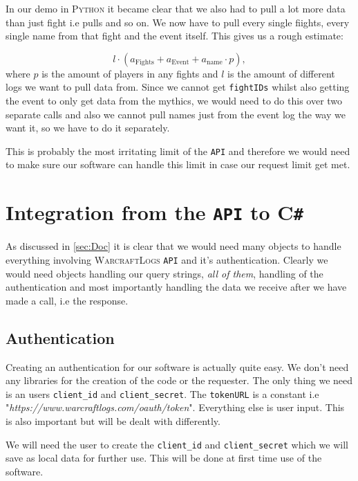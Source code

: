 \documentclass[10pt, a4paper]{memoir}
\numberwithin{equation}{section}
\theoremstyle{plain}
\theoremstyle{defp}
\theoremstyle{dotless}
\theoremstyle{definition}
\theoremstyle{dotless}
\theoremstyle{dotless}
\theoremstyle{defp}
\theoremstyle{defp}
\theoremstyle{be}          %
\theoremstyle{defp}
\newcommand\lf[1]{\left(#1\right)}
\newcommand\ttt[1]{\texttt{#1}}
\newcommand\tsc[1]{\textsc{#1}}
\begin{document}
\medskip

In our demo in \textsc{Python} it became clear that we also had to pull a lot more data than just fight i.e pulls and so on. We now have to pull every single fiights, every single name from that fight and the event itself. This gives us a rough estimate:

$$l\cdot\lf{a_{\text{Fights}}+a_{\text{Event}}+a_{\text{name}}\cdot p},$$
where $p$ is the amount of players in any fights and $l$ is the amount of different logs we want to pull data from. Since we cannot get \ttt{fightIDs} whilst also getting the event to only get data from the mythics, we would need to do this over two separate calls and also we cannot pull names just from the event log the way we want it, so we have to do it separately. 

\medskip

This is probably the most irritating limit of the \ttt{API} and therefore we would need to make sure our software can handle this limit in case our request limit get met.


\section{Integration from the \ttt{API} to C\ttt{\#}}

As discussed in \ref{sec:Doc} it is clear that we would need many objects to handle everything involving \tsc{WarcraftLogs} \ttt{API} and it's authentication. Clearly we would need objects handling our query strings, \textit{all of them}, handling of the authentication and most importantly handling the data we receive after we have made a call, i.e the response.

\subsection{Authentication}

Creating an authentication for our software is actually quite easy. We don't need any libraries for the creation of the code or the requester. The only thing we need is an users \ttt{client\_id} and \ttt{client\_secret}. The \ttt{tokenURL} is a constant i.e "\textit{https://www.warcraftlogs.com/oauth/token}". Everything else is user input. This is also important but will be dealt with differently.

\medskip

We will need the user to create the \ttt{client\_id} and \ttt{client\_secret} which we will save as local data for further use. This will be done at first time use of the software.
\end{document}
